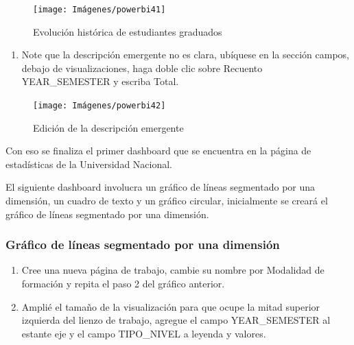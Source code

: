\documentclass[
]{book}
\providecommand{\tightlist}{%
  \setlength{\itemsep}{0pt}\setlength{\parskip}{0pt}}
\begin{document}
\begin{figure}

{\centering \texttt{[image: Imágenes/powerbi41]} 

}

\caption{Evolución histórica de estudiantes graduados}\label{fig:paso10lineaspowerbi-fig}
\end{figure}

\begin{enumerate}
\def\labelenumi{\arabic{enumi}.}
\setcounter{enumi}{10}
\tightlist
\item
  Note que la descripción emergente no es clara, ubíquese en la sección campos, debajo de visualizaciones, haga doble clic sobre Recuento YEAR\_SEMESTER y escriba Total.
\end{enumerate}

\begin{figure}

{\centering \texttt{[image: Imágenes/powerbi42]} 

}

\caption{Edición de la descripción emergente}\label{fig:paso11lineaspowerbi-fig}
\end{figure}

Con eso se finaliza el primer dashboard que se encuentra en la página de estadísticas de la Universidad Nacional.

El siguiente dashboard involucra un gráfico de líneas segmentado por una dimensión, un cuadro de texto y un gráfico circular, inicialmente se creará el gráfico de líneas segmentado por una dimensión.

\hypertarget{graficodelineassegmentadopowerbi}{%
\subsubsection{Gráfico de líneas segmentado por una dimensión}\label{graficodelineassegmentadopowerbi}}

\begin{enumerate}
\def\labelenumi{\arabic{enumi}.}
\item
  Cree una nueva página de trabajo, cambie su nombre por Modalidad de formación y repita el paso 2 del gráfico anterior.
\item
  Amplié el tamaño de la visualización para que ocupe la mitad superior izquierda del lienzo de trabajo, agregue el campo YEAR\_SEMESTER al estante eje y el campo TIPO\_NIVEL a leyenda y valores.
\end{enumerate}
\end{document}

